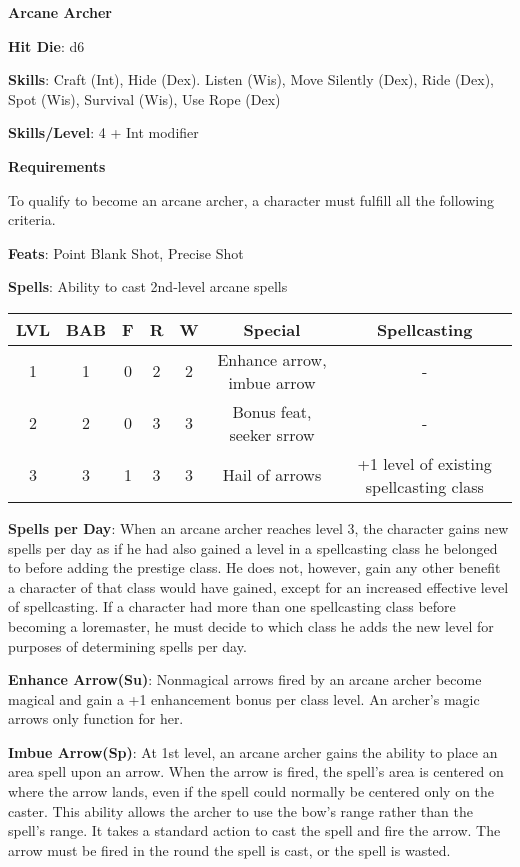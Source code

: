 \textbf{\huge{Arcane Archer}}

\textbf{Hit Die}: d6

\textbf{Skills}: Craft (Int), Hide (Dex). Listen (Wis), Move Silently (Dex), Ride (Dex), Spot (Wis), Survival (Wis), Use Rope (Dex)

\textbf{Skills/Level}: 4 + Int modifier

\textbf{\large{Requirements}}

To qualify to become an arcane archer, a character must fulfill all the following criteria.

\textbf{Feats}: Point Blank Shot, Precise Shot

\textbf{Spells}: Ability to cast 2nd-level arcane spells

\begin{center}
\begin{adjustwidth}{-4cm}{}
\begin{small}
\begin{tabular}{| c | c | c | c | c | c | c |}
\hline
LVL &BAB &F &R &W &Special &Spellcasting \\
\hline
1 &1 &0 &2 &2 &Enhance arrow, imbue arrow &- \\
2 &2 &0 &3 &3 &Bonus feat, seeker srrow &- \\
3 &3 &1 &3 &3 &Hail of arrows &+1 level of existing spellcasting class \\
\hline
\end{tabular}
\end{small}
\end{adjustwidth}
\end{center}

\textbf{Spells per Day}: When an arcane archer reaches level 3, the character gains new spells per day as if he had also gained a level in a spellcasting class he belonged to before adding the prestige class. He does not, however, gain any other benefit a character of that class would have gained, except for an increased effective level of spellcasting. If a character had more than one spellcasting class before becoming a loremaster, he must decide to which class he adds the new level for purposes of determining spells per day.

\textbf{Enhance Arrow(Su)}: Nonmagical arrows fired by an arcane archer become magical and gain a +1 enhancement bonus per class level. An archer's magic arrows only function for her. 

\textbf{Imbue Arrow(Sp)}: At 1st level, an arcane archer gains the ability to place an area spell upon an arrow. When the arrow is fired, the spell’s area is centered on where the arrow lands, even if the spell could normally be centered only on the caster. This ability allows the archer to use the bow’s range rather than the spell’s range. It takes a standard action to cast the spell and fire the arrow. The arrow must be fired in the round the spell is cast, or the spell is wasted.

